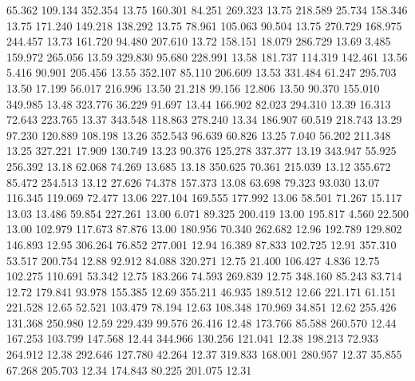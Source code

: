   65.362  109.134  352.354        13.75
 160.301   84.251  269.323        13.75
 218.589   25.734  158.346        13.75
 171.240  149.218  138.292        13.75
  78.961  105.063   90.504        13.75
 270.729  168.975  244.457        13.73
 161.720   94.480  207.610        13.72
 158.151   18.079  286.729        13.69
   3.485  159.972  265.056        13.59
 329.830   95.680  228.991        13.58
 181.737  114.319  142.461        13.56
   5.416   90.901  205.456        13.55
 352.107   85.110  206.609        13.53
 331.484   61.247  295.703        13.50
  17.199   56.017  216.996        13.50
  21.218   99.156   12.806        13.50
  90.370  155.010  349.985        13.48
 323.776   36.229   91.697        13.44
 166.902   82.023  294.310        13.39
  16.313   72.643  223.765        13.37
 343.548  118.863  278.240        13.34
 186.907   60.519  218.743        13.29
  97.230  120.889  108.198        13.26
 352.543   96.639   60.826        13.25
   7.040   56.202  211.348        13.25
 327.221   17.909  130.749        13.23
  90.376  125.278  337.377        13.19
 343.947   55.925  256.392        13.18
  62.068   74.269   13.685        13.18
 350.625   70.361  215.039        13.12
 355.672   85.472  254.513        13.12
  27.626   74.378  157.373        13.08
  63.698   79.323   93.030        13.07
 116.345  119.069   72.477        13.06
 227.104  169.555  177.992        13.06
  58.501   71.267   15.117        13.03
  13.486   59.854  227.261        13.00
   6.071   89.325  200.419        13.00
 195.817    4.560   22.500        13.00
 102.979  117.673   87.876        13.00
 180.956   70.340  262.682        12.96
 192.789  129.802  146.893        12.95
 306.264   76.852  277.001        12.94
  16.389   87.833  102.725        12.91
 357.310   53.517  200.754        12.88
  92.912   84.088  320.271        12.75
  21.400  106.427    4.836        12.75
 102.275  110.691   53.342        12.75
 183.266   74.593  269.839        12.75
 348.160   85.243   83.714        12.72
 179.841   93.978  155.385        12.69
 355.211   46.935  189.512        12.66
 221.171   61.151  221.528        12.65
  52.521  103.479   78.194        12.63
 108.348  170.969   34.851        12.62
 255.426  131.368  250.980        12.59
 229.439   99.576   26.416        12.48
 173.766   85.588  260.570        12.44
 167.253  103.799  147.568        12.44
 344.966  130.256  121.041        12.38
 198.213   72.933  264.912        12.38
 292.646  127.780   42.264        12.37
 319.833  168.001  280.957        12.37
  35.855   67.268  205.703        12.34
 174.843   80.225  201.075        12.31
